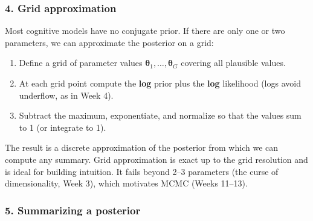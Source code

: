 \subsubsection{4. Grid approximation}

Most cognitive models have no conjugate prior. If there are only one or
two parameters, we can approximate the posterior on a grid:

\begin{enumerate}
\def\labelenumi{\arabic{enumi}.}
\tightlist
\item
  Define a grid of parameter values
  \(\boldsymbol\theta_1, \dots, \boldsymbol\theta_G\) covering all
  plausible values.
\item
  At each grid point compute the \textbf{log} prior plus the
  \textbf{log} likelihood (logs avoid underflow, as in Week 4).
\item
  Subtract the maximum, exponentiate, and normalize so that the values
  sum to 1 (or integrate to 1).
\end{enumerate}

The result is a discrete approximation of the posterior from which we
can compute any summary. Grid approximation is exact up to the grid
resolution and is ideal for building intuition. It fails beyond 2--3
parameters (the curse of dimensionality, Week 3), which motivates MCMC
(Weeks 11--13).

\subsubsection{5. Summarizing a posterior}

